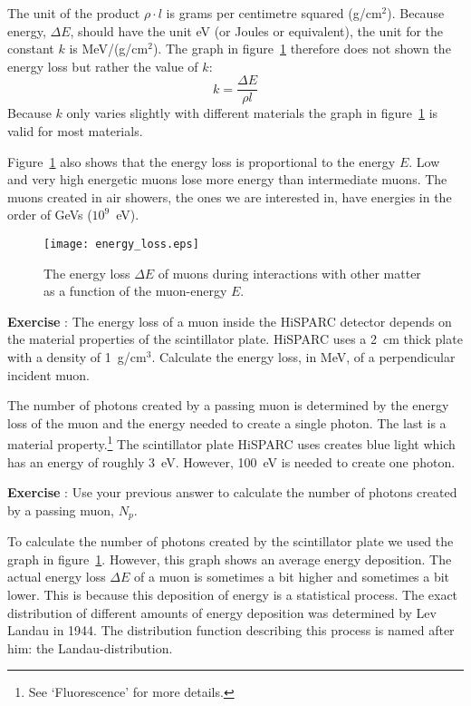 The unit of the product $\rho \cdot l$ is grams per centimetre squared (g/cm$^2$). Because energy, $\Delta E$, should have the unit eV (or Joules or equivalent), the unit for the constant $k$ is MeV/(g/cm$^2$). The graph in figure~\ref{fig:energy_loss} therefore does not shown the energy loss but rather the value of $k$:
\begin{equation}
k = \frac{\Delta E}{\rho l }
\end{equation}
Because $k$ only varies slightly with different materials the graph in figure~\ref{fig:energy_loss} is valid for most materials.

Figure~\ref{fig:energy_loss} also shows that the energy loss is proportional to the energy $E$. Low and very high energetic muons lose more energy than intermediate muons. The muons created in air showers, the ones we are interested in, have energies in the order of GeVs ($10^9$~eV).

\begin{figure}\begin{center}
\texttt{[image: energy\_loss.eps]}%
\caption{The energy loss $\Delta E$ of muons during interactions with other matter as a function of the muon-energy $E$.}\label{fig:energy_loss}
\end{center}\end{figure}

\begin{shaded}
\textbf{Exercise \theExercise {}} : The energy loss of a muon inside the HiSPARC detector depends on the material properties of the scintillator plate. HiSPARC uses a 2~cm thick plate with a density of 1~g/cm$^3$. Calculate the energy loss, in MeV, of a perpendicular incident muon.\end{shaded}

The number of photons created by a passing muon is determined by the energy loss of the muon and the energy needed to create a single photon. The last is a material property.\footnote{See `Fluorescence' for more details.} The scintillator plate HiSPARC uses creates blue light which has an energy of roughly 3~eV. However, 100~eV is needed to create one photon. 

\begin{shaded}
\textbf{Exercise \theExercise {}} :  Use your previous answer to calculate the number of photons created by a passing muon, $N_p$.\end{shaded}

To calculate the number of photons created by the scintillator plate we used the  graph in figure~\ref{fig:energy_loss}. However, this graph shows an average energy deposition. The actual energy loss $\Delta E$ of a muon is sometimes a bit higher and sometimes a bit lower. This is because this deposition of energy is a statistical process. The exact distribution of different amounts of energy deposition was determined by Lev Landau in 1944. The distribution function describing this process is named after him: the Landau-distribution.

